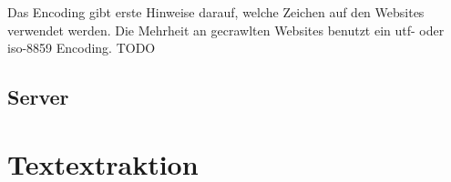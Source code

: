 \documentclass[a4paper,12pt,titlepage=false]{scrreprt}
\begin{document}
Das Encoding gibt erste Hinweise darauf, welche Zeichen auf den Websites verwendet werden. Die Mehrheit an gecrawlten Websites benutzt ein utf- oder iso-8859 Encoding. TODO

\section{Server}
\vspace{.1cm}


\chapter{Textextraktion}

\end{document}
